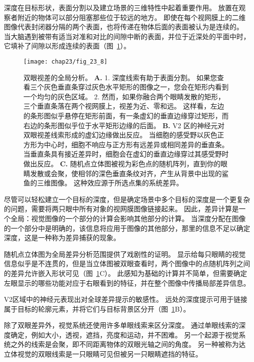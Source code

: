 深度在目标形状，表面分割以及建立场景的三维特性中起着重要作用。
放置在观察者附近的物体可以部分阻塞那些位于较远的地方。
即使在每个视网膜上的二维图像代表封闭器分隔的两个表面，也将传递在物体后面的表面被认为是连续的。
当大脑遇到被带有适当对准和对比的间隙中断的表面，并位于近深处的平面中时，它填补了间隙以形成连续的表面（图~\ref{fig:23_8}）。


\begin{figure}[htbp]
	\centering
	\texttt{[image: chap23/fig\_23\_8]}
	\caption{双眼视差的全局分析。
		\textbf{A.} 1. 深度线索有助于表面分割。
		如果您查看三个灰色垂直条穿过灰色水平矩形的图像之一，您会在矩形内看到一个均匀的灰色区域。
		2. 然而，如果你融合两个眼睛发散的矩形，三个垂直条落在两个视网膜上，视差为近、零和远。
		这样看，左边的条形图似乎悬停在矩形前面，有一条虚幻的垂直边缘穿过矩形，而右边的条形图似乎位于水平矩形边缘的后面。
		\textbf{B.} V2 区的神经元对双眼视差线索形成的虚幻边缘做出反应。
		当细胞的感受野以灰色正方形为中心时，细胞不响应与正方形有远差异或相同差异的垂直条。
		当垂直条具有接近差异时，细胞会在虚幻的垂直边缘穿过其感受野时做出反应\cite{bakin2000visual}。
		\textbf{C.} 随机点立体图被视为彩色点的随机阵列，直到你的眼睛发散或会聚，使相邻的深色垂直条纹对齐，产生从背景中出现的鲨鱼的三维图像。
		这种效应源于所选点集的系统差异。}
	\label{fig:23_8}
\end{figure}


尽管可以轻松建立一个目标的深度，但是确定场景中多个目标的深度是一个更复杂的问题，需要将两只眼中所有对象的视网膜图像链接起来。
因此，差异计算是一个全局：视觉图像的一个部分的计算会影响其他部分的计算。
当深度分配在图像的一个部分中是明确的，该信息将应用于图像的其他部分，那里的信息不足以确定深度，这是一种称为差异捕获的现象。


随机点立体图为全局差异分析范围提供了戏剧性的证明。
显示给每只眼睛的视觉信息似乎是不连贯的，但是当立体图被双眼查看时，两个图像中的点随机阵列之间的差异允许嵌入形状可见（图~\ref{fig:23_8}C）。
此感知为基础的计算并不简单，但需要确定左眼显示的哪些功能对应于右眼看到的特征，并在整个图像中传播局部差异信息。


V2区域中的神经元表现出对全球差异提示的敏感性。 
远处的深度提示可用于链接属于目标的轮廓元素，并将它们与目标背景区分开（图~\ref{fig:23_8}B）。


除了双眼差异外，视觉系统还使用许多单眼线索来区分深度。
通过单眼线索的深度确定，例如大小，透视，遮挡，亮度和运动，并不困难。
另一个起源于视觉系统之外的线索是会聚，即不同距离物体的双眼光轴之间的角度。
另一种被称为达立体视觉的双眼线索是一只眼睛可见但被另一只眼睛遮挡的特征。


